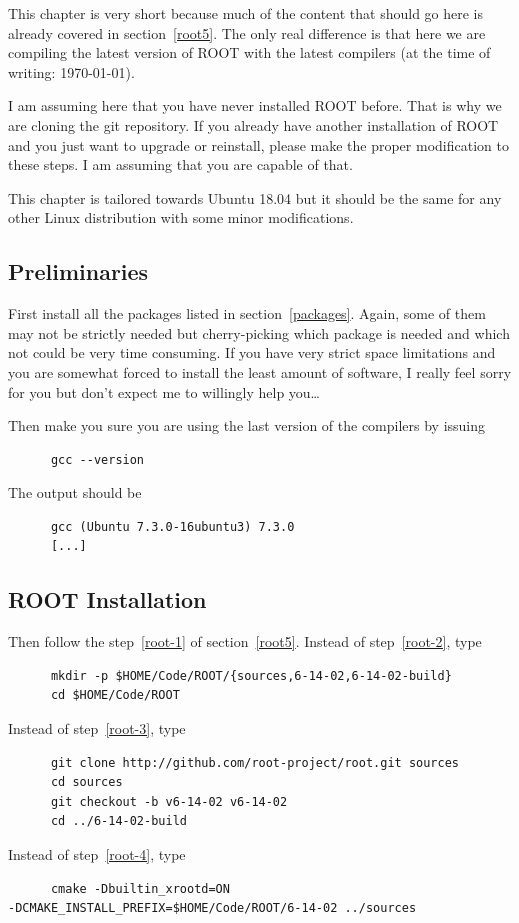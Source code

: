 This chapter is very short because much of the content that should go here is
already covered in section~\ref{root5}. The only real difference is that here we
are compiling the latest version of ROOT with the latest compilers (at the time
of writing: \today).

I am assuming here that you have never installed ROOT before. That is why we are
cloning the git repository. If you already have another installation of ROOT and
you just want to upgrade or reinstall, please make the proper modification to
these steps. I am assuming that you are capable of that.

This chapter is tailored towards Ubuntu 18.04 but it should be the same for any
other Linux distribution with some minor modifications.

\subsection{Preliminaries} First install all the packages listed in
section~\ref{packages}. Again, some of them may not be strictly needed but
cherry-picking which package is needed and which not could be very time
consuming. If you have very strict space limitations and you are somewhat forced
to install the least amount of software, I really feel sorry for you but don't
expect me to willingly help you\dots

Then make you sure you are using the last version of the compilers by issuing
\begin{lstlisting}
      gcc --version
\end{lstlisting}
The output should be
\begin{lstlisting}
      gcc (Ubuntu 7.3.0-16ubuntu3) 7.3.0
      [...]
\end{lstlisting}

\subsection{ROOT Installation}

Then follow the step~\ref{root-1} of section~\ref{root5}. Instead of
step~\ref{root-2}, type
\begin{lstlisting}
      mkdir -p $HOME/Code/ROOT/{sources,6-14-02,6-14-02-build}
      cd $HOME/Code/ROOT
\end{lstlisting}
Instead of step~\ref{root-3}, type
\begin{lstlisting}
      git clone http://github.com/root-project/root.git sources
      cd sources
      git checkout -b v6-14-02 v6-14-02
      cd ../6-14-02-build
\end{lstlisting}
Instead of step~\ref{root-4}, type
\begin{lstlisting}
      cmake -Dbuiltin_xrootd=ON
-DCMAKE_INSTALL_PREFIX=$HOME/Code/ROOT/6-14-02 ../sources
\end{lstlisting}

